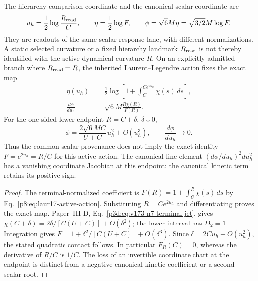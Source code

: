\documentclass[12pt,a4paper]{article}
\begin{document}
\begin{corollary}
\label{p8:cor:v2202-hierarchy-canonical-scalar-map}
The hierarchy comparison coordinate and the canonical scalar coordinate are
\[
 u_h=\frac12\log\frac{R_{\rm read}}C,\qquad
 \eta=\frac12\log F,\qquad
 \phi=\sqrt6M\eta=\sqrt{3/2}M\log F.
\]
They are readouts of the same scalar response lane, with different
normalizations.  A static selected curvature or a fixed hierarchy landmark
$R_{\rm read}$ is not thereby identified with the active dynamical
curvature $R$.  On an explicitly admitted branch where $R_{\rm read}=R$,
the inherited Laurent--Legendre action fixes the exact map
\begin{equation}
\label{p8:eq:v2202-exact-scalar-coordinate-map}
 \boxed{\begin{aligned}
 \eta(u_h)&=\frac12\log\!\left[1+
   \int_C^{Ce^{2u_h}}\chi(s)\,ds\right],\\
 \frac{d\phi}{du_h}&=\sqrt6M\frac{R\chi(R)}{F(R)}.
 \end{aligned}}
\end{equation}
For the one-sided lower endpoint $R=C+\delta$, $\delta\downarrow0$,
\begin{equation}
\label{p8:eq:v2202-quadratic-scalar-coordinate-contact}
 \boxed{\phi=
 \frac{2\sqrt6MC}{U+C}\,u_h^2+O(u_h^3),\qquad
 \frac{d\phi}{du_h}\longrightarrow0.}
\end{equation}
Thus the common scalar provenance does not imply the exact identity
$F=e^{2u_h}=R/C$ for this active action.  The canonical line element
$(d\phi/du_h)^2du_h^2$ has a vanishing coordinate Jacobian at this
endpoint; the canonical kinetic term retains its positive sign.
\end{corollary}
\begin{proof}
The terminal-normalized coefficient is
$F(R)=1+\int_C^R\chi(s)\,ds$ by
Eq.~\eqref{p8:eq:laur17-active-action}.  Substituting
$R=Ce^{2u_h}$ and differentiating proves the exact map.
Paper~III-D, Eq.~\ref{p3d:eq:v173-n7-terminal-jet}, gives
$\chi(C+\delta)=2\delta/[C(U+C)]+O(\delta^2)$; the lower interval has
$D_2=1$.  Integration gives
$F=1+\delta^2/[C(U+C)]+O(\delta^3)$.
Since $\delta=2Cu_h+O(u_h^2)$, the stated quadratic contact follows.
In particular $F_R(C)=0$, whereas the derivative of $R/C$ is $1/C$.
The loss of an invertible coordinate chart at the endpoint is distinct
from a negative canonical kinetic coefficient or a second scalar root.
\end{proof}
\end{document}
